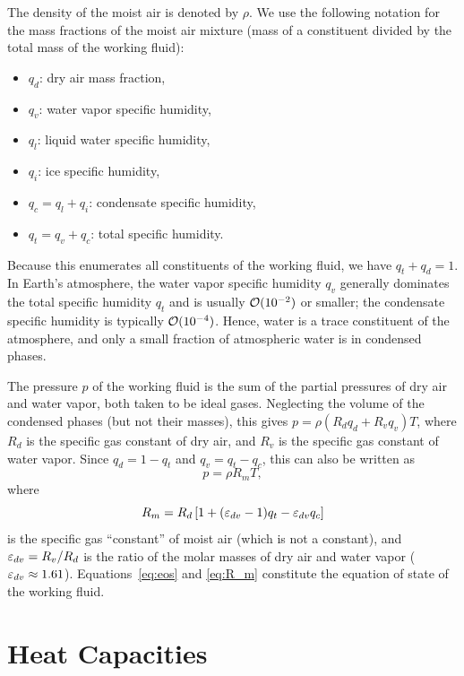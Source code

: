 \documentclass{report}
\begin{document}
The density of the moist air is denoted by $\rho$. We use the following notation for the mass fractions of the moist air mixture (mass of a constituent divided by the total mass of the working fluid):
\begin{itemize}
\item $q_d$: dry air mass fraction,
\item $q_v$: water vapor specific humidity,
\item $q_l$: liquid water specific humidity,
\item $q_i$: ice specific humidity,
\item $q_c = q_l + q_i$: condensate specific humidity,
\item $q_t = q_v + q_c$: total specific humidity.
\end{itemize}
Because this enumerates all constituents of the working fluid, we have $q_t + q_d = 1$. In Earth's atmosphere, the water vapor specific humidity $q_v$ generally dominates the total specific humidity $q_t$ and is usually $\mathcal{O}(10^{-2})$ or smaller; the condensate specific humidity is typically $\mathcal{O}(10^{-4})$. Hence, water is a trace constituent of the atmosphere, and only a small fraction of atmospheric water is in condensed phases. 

The pressure $p$ of the working fluid is the sum of the partial pressures of dry air and water vapor, both taken to be ideal gases. Neglecting the volume of the condensed phases (but not their masses), this gives $p = \rho (R_d q_d + R_v q_v) T$, where $R_d$ is the specific gas constant of dry air, and $R_v$ is the specific gas constant of water vapor. Since $q_d = 1-q_t$ and $q_v = q_t - q_c$, this can also be written as
\begin{equation}
    p = \rho R_m T,
\label{eq:eos}
\end{equation}
where
\begin{equation}
    R_m = R_d \left[1 + (\varepsilon_{dv}-1)q_t - \varepsilon_{dv} q_c\right]
\label{eq:R_m}
\end{equation}
is the specific gas ``constant'' of moist air (which is not a constant), and $\varepsilon_{dv} = R_v/R_d$ is the ratio of the molar masses of dry air and water vapor ($\varepsilon_{dv} \approx 1.61$). Equations~\eqref{eq:eos} and \eqref{eq:R_m} constitute the equation of state of the working fluid.

\section{Heat Capacities}\label{s:heat_capacities}
\end{document}
